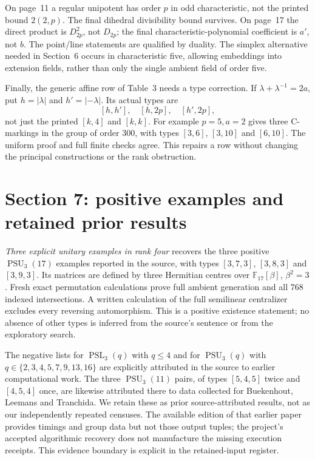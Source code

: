 \documentclass[11pt]{article}
\newcommand{\F}{\mathbb F}\newcommand{\PSL}{\operatorname{PSL}}\newcommand{\PSU}{\operatorname{PSU}}
\begin{document}
On page~11 a regular unipotent has order $p$ in odd characteristic,
not the printed bound $2(2,p)$. The final dihedral divisibility bound
survives. On page~17 the direct product is $D_{2p}^2$, not $D_{2p}$;
the final characteristic-polynomial coefficient is $a'$, not $b$.
The point/line statements are qualified by duality. The simplex
alternative needed in Section~6 occurs in characteristic five, allowing
embeddings into extension fields, rather than only the single ambient
field of order five.

Finally, the generic affine row of Table~3 needs a type correction.
If $\lambda+\lambda^{-1}=2a$, put $h=|\lambda|$ and
$h'=|{-\lambda}|$. Its actual types are
\[
                       [h,h'],\quad[h,2p],\quad[h',2p],
\]
not just the printed $[k,4]$ and $[k,k]$. For example $p=5,a=2$
gives three C-markings in the group of order $300$, with types
$[3,6]$, $[3,10]$ and $[6,10]$. The uniform proof and full finite
checks agree. This repairs a row without changing the principal
constructions or the rank obstruction.

\section*{Section 7: positive examples and retained prior results}
\emph{Three explicit unitary examples in rank four} recovers the three
positive $\PSU_3(17)$ examples reported in the source, with types
$[3,7,3]$, $[3,8,3]$ and $[3,9,3]$. Its matrices are defined by three
Hermitian centres over $\F_{17}[\beta]$, $\beta^2=3$. Fresh exact
permutation calculations prove full ambient generation and all $768$
indexed intersections. A written calculation of the full semilinear
centralizer excludes every reversing automorphism. This is a positive
existence statement; no absence of other types is inferred from the
source's sentence or from the exploratory search.

The negative lists for $\PSL_3(q)$ with $q\le4$ and for
$\PSU_3(q)$ with $q\in\{2,3,4,5,7,9,13,16\}$ are explicitly
attributed in the source to earlier computational work. The three
$\PSU_3(11)$ pairs, of types $[5,4,5]$ twice and $[4,5,4]$ once,
are likewise attributed there to data collected for Buekenhout,
Leemans and Tranchida. We retain these as prior source-attributed
results, not as our independently repeated censuses. The available
edition of that earlier paper provides timings and group data but not
those output tuples; the project's accepted algorithmic recovery does
not manufacture the missing execution receipts. This evidence boundary
is explicit in the retained-input register.
\end{document}
